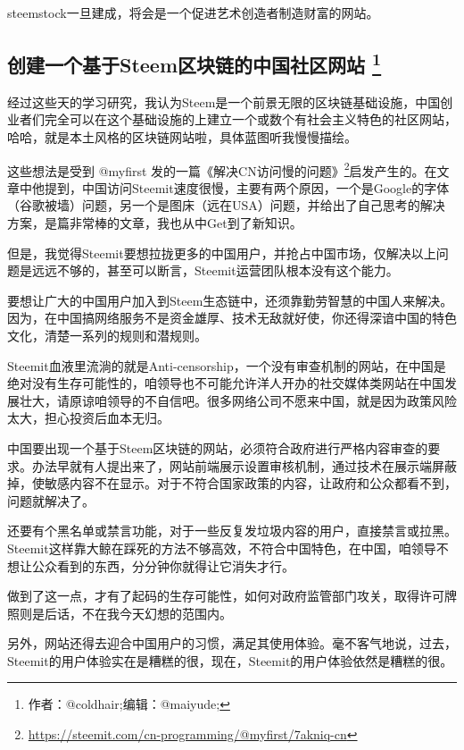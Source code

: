\documentclass[]{ctexbook}
\renewcommand{\href}[2]{#2\footnote{\url{#1}}}
\begin{document}
steemstock一旦建成，将会是一个促进艺术创造者制造财富的网站。

\hypertarget{steem}{%
\subsection[创建一个基于Steem区块链的中国社区网站 ]{\texorpdfstring{创建一个基于Steem区块链的中国社区网站 \footnote{作者：@coldhair;编辑：@maiyude;}}{创建一个基于Steem区块链的中国社区网站 }}\label{steem}}

经过这些天的学习研究，我认为Steem是一个前景无限的区块链基础设施，中国创业者们完全可以在这个基础设施的上建立一个或数个有社会主义特色的社区网站，哈哈，就是本土风格的区块链网站啦，具体蓝图听我慢慢描绘。

这些想法是受到 @myfirst 发的一篇\href{https://steemit.com/cn-programming/@myfirst/7akniq-cn}{《解决CN访问慢的问题》}启发产生的。在文章中他提到，中国访问Steemit速度很慢，主要有两个原因，一个是Google的字体（谷歌被墙）问题，另一个是图床（远在USA）问题，并给出了自己思考的解决方案，是篇非常棒的文章，我也从中Get到了新知识。

但是，我觉得Steemit要想拉拢更多的中国用户，并抢占中国市场，仅解决以上问题是远远不够的，甚至可以断言，Steemit运营团队根本没有这个能力。

要想让广大的中国用户加入到Steem生态链中，还须靠勤劳智慧的中国人来解决。因为，在中国搞网络服务不是资金雄厚、技术无敌就好使，你还得深谙中国的特色文化，清楚一系列的规则和潜规则。

Steemit血液里流淌的就是Anti-censorship，一个没有审查机制的网站，在中国是绝对没有生存可能性的，咱领导也不可能允许洋人开办的社交媒体类网站在中国发展壮大，请原谅咱领导的不自信吧。很多网络公司不愿来中国，就是因为政策风险太大，担心投资后血本无归。

中国要出现一个基于Steem区块链的网站，必须符合政府进行严格内容审查的要求。办法早就有人提出来了，网站前端展示设置审核机制，通过技术在展示端屏蔽掉，使敏感内容不在显示。对于不符合国家政策的内容，让政府和公众都看不到，问题就解决了。

还要有个黑名单或禁言功能，对于一些反复发垃圾内容的用户，直接禁言或拉黑。Steemit这样靠大鲸在踩死的方法不够高效，不符合中国特色，在中国，咱领导不想让公众看到的东西，分分钟你就得让它消失才行。

做到了这一点，才有了起码的生存可能性，如何对政府监管部门攻关，取得许可牌照则是后话，不在我今天幻想的范围内。

另外，网站还得去迎合中国用户的习惯，满足其使用体验。毫不客气地说，过去，Steemit的用户体验实在是糟糕的很，现在，Steemit的用户体验依然是糟糕的很。
\end{document}
